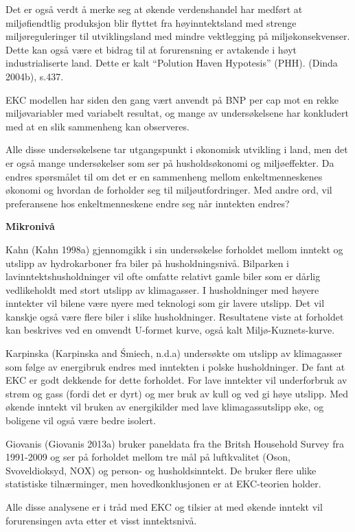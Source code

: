 \documentclass[
  12pt,
  letterpaper,
  DIV=11,
  numbers=noendperiod]{scrartcl}
\begin{document}
Det er også verdt å merke seg at økende verdenshandel har medført at
miljøfiendtlig produksjon blir flyttet fra høyinntektsland med strenge
miljøreguleringer til utviklingsland med mindre vektlegging på
miljøkonsekvenser. Dette kan også være et bidrag til at forurensning er
avtakende i høyt industrialiserte land. Dette er kalt ``Polution Haven
Hypotesis'' (PHH). (Dinda 2004b), s.437.

EKC modellen har siden den gang vært anvendt på BNP per cap mot en rekke
miljøvariabler med variabelt resultat, og mange av undersøkelsene har
konkludert med at en slik sammenheng kan observeres.

Alle disse undersøkelsene tar utgangspunkt i økonomisk utvikling i land,
men det er også mange undersøkelser som ser på husholdsøkonomi og
miljøeffekter. Da endres spørsmålet til om det er en sammenheng mellom
enkeltmenneskenes økonomi og hvordan de forholder seg til
miljøutfordringer. Med andre ord, vil preferansene hos enkeltmenneskene
endre seg når inntekten endres?

\textbf{Mikronivå}

Kahn (Kahn 1998a) gjennomgikk i sin undersøkelse forholdet mellom
inntekt og utslipp av hydrokarboner fra biler på husholdningsnivå.
Bilparken i lavinntektshusholdninger vil ofte omfatte relativt gamle
biler som er dårlig vedlikeholdt med stort utslipp av klimagasser. I
husholdninger med høyere inntekter vil bilene være nyere med teknologi
som gir lavere utslipp. Det vil kanskje også være flere biler i slike
husholdninger. Resultatene viste at forholdet kan beskrives ved en
omvendt U-formet kurve, også kalt Miljø-Kuznets-kurve.

Karpinska (Karpinska and Śmiech, n.d.a) undersøkte om utslipp av
klimagasser som følge av energibruk endres med inntekten i polske
husholdninger. De fant at EKC er godt dekkende for dette forholdet. For
lave inntekter vil underforbruk av strøm og gass (fordi det er dyrt) og
mer bruk av kull og ved gi høye utslipp. Med økende inntekt vil bruken
av energikilder med lave klimagassutslipp øke, og boligene vil også være
bedre isolert.

Giovanis (Giovanis 2013a) bruker paneldata fra the Britsh Household
Survey fra 1991-2009 og ser på forholdet mellom tre mål på luftkvalitet
(Oson, Svoveldioksyd, NOX) og person- og husholdsinntekt. De bruker
flere ulike statistiske tilnærminger, men hovedkonklusjonen er at
EKC-teorien holder.

Alle disse analysene er i tråd med EKC og tilsier at med økende inntekt
vil forurensingen avta etter et visst inntektsnivå.
\end{document}
